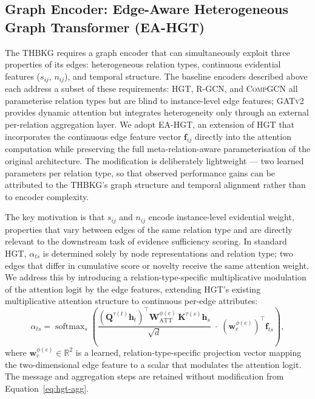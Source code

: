 \documentclass[a4,center]{NAR}
\newcommand{\hgt}{\textsc{HGT}}
\newcommand{\gatv}{\textsc{GATv2}}
\newcommand{\rgcn}{\textsc{R-GCN}}
\newcommand{\compgcn}{\textsc{CompGCN}}
\newcommand{\eahgt}{\textsc{EA-HGT}}
\begin{document}
{%
\subsection{Graph Encoder: Edge-Aware Heterogeneous Graph Transformer (\eahgt{})}
\label{sec:eahgt}

The THBKG requires a graph encoder that can simultaneously exploit three
properties of its edges: heterogeneous relation types, continuous evidential
features ($s_{ij}$, $n_{ij}$), and temporal structure. The baseline
encoders described above each address a subset of these requirements:
\hgt{}, \rgcn{}, and \compgcn{} all parameterise relation types but are
blind to instance-level edge features; \gatv{} provides dynamic attention
but integrates heterogeneity only through an external per-relation
aggregation layer. We adopt \eahgt{}, an extension of \hgt{} that incorporates the
continuous edge feature vector $\mathbf{f}_{ij}$ directly into the attention
computation while preserving the full meta-relation-aware parameterisation of
the original architecture. The modification is deliberately lightweight ---
two learned parameters per relation type, so that observed performance gains
can be attributed to the THBKG's graph structure and temporal alignment rather
than to encoder complexity.

The key motivation is that $s_{ij}$ and $n_{ij}$ encode instance-level
evidential weight, properties that vary between edges of the same relation
type and are directly relevant to the downstream task of evidence sufficiency
scoring. In standard \hgt{}, $\alpha_{ts}$ is determined solely by node
representations and relation type; two edges that differ in cumulative score or
novelty receive the same attention weight. We address this by introducing a
relation-type-specific multiplicative modulation of the attention logit by
the edge features, extending HGT's existing multiplicative attention
structure to continuous per-edge attributes:
\begin{equation}
    \alpha_{ts} = \operatorname{softmax}_{s}\!\left(
        \frac{
            \left(\mathbf{Q}^{\tau(t)} \mathbf{h}_t\right)^\top
            \mathbf{W}^{\phi(e)}_{\mathrm{ATT}}\,
            \mathbf{K}^{\tau(s)} \mathbf{h}_s
        }{\sqrt{d}}
        \;\cdot\;
        \left(\mathbf{w}^{\phi(e)}_e\right)^\top \mathbf{f}_{ts}
    \right),
    \label{eq:eahgt-attn}
\end{equation}
where $\mathbf{w}^{\phi(e)}_e \in \mathbb{R}^2$ is a learned,
relation-type-specific projection vector mapping the two-dimensional edge
feature to a scalar that modulates the attention logit. The message and
aggregation steps are retained without modification from
Equation~\eqref{eq:hgt-agg}.

}
\end{document}
